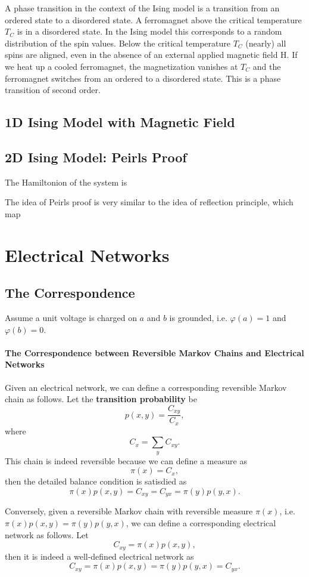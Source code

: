 \documentclass{article}
\theoremstyle{definition}
\newcommand{\<}{\left\langle}
\renewcommand{\>}{\right\rangle}
\begin{document}
A phase transition in the context of the Ising model is a transition from an ordered state
to a disordered state. A ferromagnet above the critical temperature $T_C$ is in a disordered
state. In the Ising model this corresponds to a random distribution of the spin values.
Below the critical temperature $T_C$ (nearly) all spins are aligned, even in the absence of an
external applied magnetic field H. If we heat up a cooled ferromagnet, the magnetization
vanishes at $T_C$ and the ferromagnet switches from an ordered to a disordered state. This
is a phase transition of second order.


\subsection{1D Ising Model with Magnetic Field}

\subsection{2D Ising Model: Peirls Proof}
The Hamiltonion of the system is 
\[ \]

The idea of Peirls proof is very similar to the idea of reflection principle,
which map 


\section{Electrical Networks}
\subsection{The Correspondence}

Assume a unit voltage is charged on $a$ and $b$ is grounded, i.e. $\varphi(a)=1$ and $\varphi(b)=0$.

\paragraph{The Correspondence between Reversible Markov Chains and Electrical Networks}
Given an electrical network, we can define a corresponding reversible Markov chain as follows.
Let the \textbf{transition probability} be \[p(x,y)=\frac{C_{xy}}{C_x},\] 
where \[C_x=\sum_{y} C_{xy} .\]
This chain is indeed reversible because we can define a measure as 
\[\pi(x)=C_x,\] 
then the detailed balance condition is satisdied as 
\[\pi(x)p(x,y)= C_{xy}= C_{yx}=\pi(y)p(y,x).\]


Conversely, given a reversible Markov chain with reversible measure $\pi(x)$, i.e. $\pi(x)p(x,y)=\pi(y)p(y,x)$,
we can define a corresponding electrical network as follows.
Let \[C_{xy}=\pi(x)p(x,y),\]
then it is indeed a well-defined electrical network as 
\[C_{xy}=\pi(x)p(x,y)=\pi(y)p(y,x)=C_{yx}. \]
\end{document}
